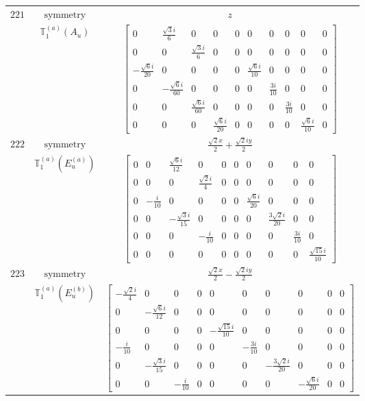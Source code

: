 \documentclass[fleqn,8pt,landscape]{jsarticle}
\begin{document}
\begin{longtable}{ccc}
$ 221 $ & $ \text{symmetry} $ & $ z $ \\
$  $ & $ \mathbb{T}_{1}^{(a)}(A_{u}) $ & $ \begin{bmatrix} 0 & \frac{\sqrt{3} i}{6} & 0 & 0 & 0 & 0 & 0 & 0 & 0 & 0 \\ 0 & 0 & \frac{\sqrt{3} i}{6} & 0 & 0 & 0 & 0 & 0 & 0 & 0 \\ - \frac{\sqrt{6} i}{20} & 0 & 0 & 0 & 0 & \frac{\sqrt{6} i}{10} & 0 & 0 & 0 & 0 \\ 0 & - \frac{\sqrt{6} i}{60} & 0 & 0 & 0 & 0 & \frac{3 i}{10} & 0 & 0 & 0 \\ 0 & 0 & \frac{\sqrt{6} i}{60} & 0 & 0 & 0 & 0 & \frac{3 i}{10} & 0 & 0 \\ 0 & 0 & 0 & \frac{\sqrt{6} i}{20} & 0 & 0 & 0 & 0 & \frac{\sqrt{6} i}{10} & 0 \end{bmatrix} $ \\ \hline
$ 222 $ & $ \text{symmetry} $ & $ \frac{\sqrt{2} x}{2} + \frac{\sqrt{2} i y}{2} $ \\
$  $ & $ \mathbb{T}_{1}^{(a)}(E_{u}^{(a)}) $ & $ \begin{bmatrix} 0 & 0 & \frac{\sqrt{6} i}{12} & 0 & 0 & 0 & 0 & 0 & 0 & 0 \\ 0 & 0 & 0 & \frac{\sqrt{2} i}{4} & 0 & 0 & 0 & 0 & 0 & 0 \\ 0 & - \frac{i}{10} & 0 & 0 & 0 & 0 & \frac{\sqrt{6} i}{20} & 0 & 0 & 0 \\ 0 & 0 & - \frac{\sqrt{3} i}{15} & 0 & 0 & 0 & 0 & \frac{3 \sqrt{2} i}{20} & 0 & 0 \\ 0 & 0 & 0 & - \frac{i}{10} & 0 & 0 & 0 & 0 & \frac{3 i}{10} & 0 \\ 0 & 0 & 0 & 0 & 0 & 0 & 0 & 0 & 0 & \frac{\sqrt{15} i}{10} \end{bmatrix} $ \\ \hline
$ 223 $ & $ \text{symmetry} $ & $ \frac{\sqrt{2} x}{2} - \frac{\sqrt{2} i y}{2} $ \\
$  $ & $ \mathbb{T}_{1}^{(a)}(E_{u}^{(b)}) $ & $ \begin{bmatrix} - \frac{\sqrt{2} i}{4} & 0 & 0 & 0 & 0 & 0 & 0 & 0 & 0 & 0 \\ 0 & - \frac{\sqrt{6} i}{12} & 0 & 0 & 0 & 0 & 0 & 0 & 0 & 0 \\ 0 & 0 & 0 & 0 & - \frac{\sqrt{15} i}{10} & 0 & 0 & 0 & 0 & 0 \\ - \frac{i}{10} & 0 & 0 & 0 & 0 & - \frac{3 i}{10} & 0 & 0 & 0 & 0 \\ 0 & - \frac{\sqrt{3} i}{15} & 0 & 0 & 0 & 0 & - \frac{3 \sqrt{2} i}{20} & 0 & 0 & 0 \\ 0 & 0 & - \frac{i}{10} & 0 & 0 & 0 & 0 & - \frac{\sqrt{6} i}{20} & 0 & 0 \end{bmatrix} $ \\ \hline

\end{longtable}
\end{document}

